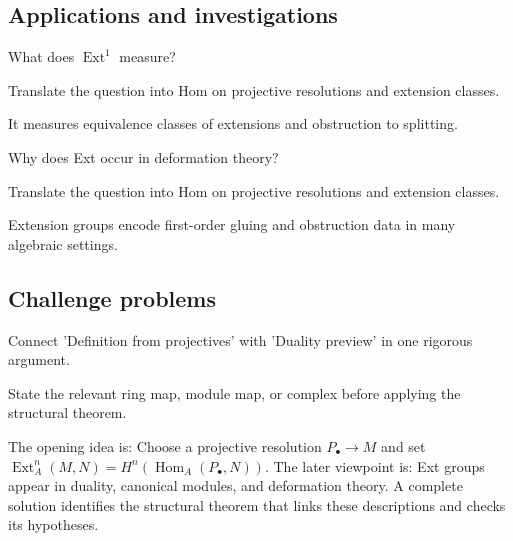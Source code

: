 \subsection*{Applications and investigations}

\begin{exercise}\label{exr:v27-expand-13}
What does $\operatorname{Ext}^1$ measure?
\end{exercise}
\begin{hint}
Translate the question into Hom on projective resolutions and extension classes.
\end{hint}
\begin{solution}
It measures equivalence classes of extensions and obstruction to splitting.
\end{solution}

\begin{exercise}\label{exr:v27-expand-14}
Why does Ext occur in deformation theory?
\end{exercise}
\begin{hint}
Translate the question into Hom on projective resolutions and extension classes.
\end{hint}
\begin{solution}
Extension groups encode first-order gluing and obstruction data in many algebraic settings.
\end{solution}

\subsection*{Challenge problems}

\begin{exercise}\label{exr:v27-expand-15}
Connect 'Definition from projectives' with 'Duality preview' in one rigorous argument.
\end{exercise}
\begin{hint}
State the relevant ring map, module map, or complex before applying the structural theorem.
\end{hint}
\begin{solution}
The opening idea is: Choose a projective resolution $P_\bullet\to M$ and set $\operatorname{Ext}_A^n(M,N)=H^n(\operatorname{Hom}_A(P_\bullet,N))$. The later viewpoint is: Ext groups appear in duality, canonical modules, and deformation theory. A complete solution identifies the structural theorem that links these descriptions and checks its hypotheses.
\end{solution}

